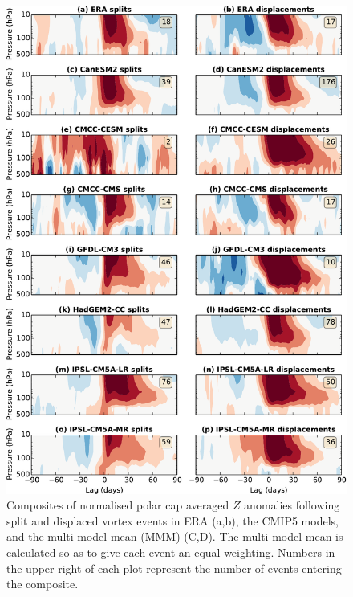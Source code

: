\begin{figure}
 \centering
 \noindent\includegraphics[width=\textwidth]{figures/chapter-models/dripping_paint1.pdf}
 \caption[NAM composites for splits and displacements in the CMIP5
 models]{Composites of normalised polar cap averaged $Z$ anomalies following
   split and displaced vortex events in ERA (a,b), the CMIP5 models, and the
   multi-model mean (MMM) (C,D). The multi-model mean is calculated so as to
   give each event an equal weighting. Numbers in the upper right of each plot
   represent the number of events entering the composite.}
 \label{fig:cmip5_dripping_paint}
\end{figure}

